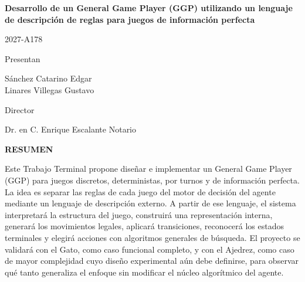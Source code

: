 \begin{center}

    {\Large\bfseries
        Desarrollo de un General Game Player (GGP) utilizando un
        lenguaje de descripción de reglas para juegos de información
        perfecta
        \par}

    \vspace{0.5em}

    2027-A178

\end{center}

\vspace{0.5em}


\begin{center}

    Presentan

    \vspace{0.5em}

    {\large
        Sánchez Catarino Edgar\\[0.5em]
        Linares Villegas Gustavo
    }

\end{center}

\vspace{1.5em}


\begin{center}

    Director

    \vspace{0.5em}

    {\large
        Dr. en C. Enrique Escalante Notario
    }

\end{center}

\vspace{1.8em}


\begin{center}
    \bfseries RESUMEN
\end{center}

\vspace{0.5em}

\noindent
Este Trabajo Terminal propone diseñar e implementar un General Game Player (GGP) para juegos discretos, deterministas, por turnos y de información perfecta. La idea es separar las reglas de cada juego del motor de decisión del agente mediante un lenguaje de descripción externo. A partir de ese lenguaje, el sistema interpretará la estructura del juego, construirá una representación interna, generará los movimientos legales, aplicará transiciones, reconocerá los estados terminales y elegirá acciones con algoritmos generales de búsqueda. El proyecto se validará con el Gato, como caso funcional completo, y con el Ajedrez, como caso de mayor complejidad cuyo diseño experimental aún debe definirse, para observar qué tanto generaliza el enfoque sin modificar el núcleo algorítmico del agente.

